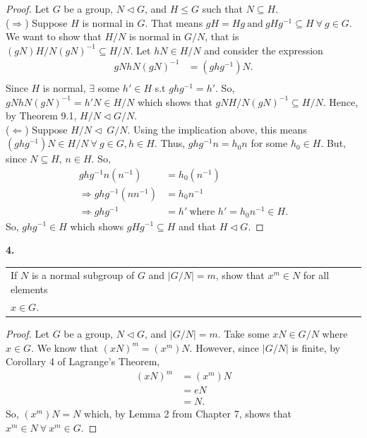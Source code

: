 \documentclass[12pt, letterpaper]{article}
\begin{document}
\begin{proof}
    Let $G$ be a group, $N \lhd G$, and $H \leq G$ such that $N \subseteq H$. \\
    ($\Rightarrow$) Suppose $H$ is normal in $G$. That means $gH = Hg \ \text{and} \ gHg^{-1} \subseteq H\ \forall \ g \in G$. We want to show that $H/N$ is normal in $G/N$, that is $(gN)H/N(gN)^{-1} \subseteq H/N$. Let $hN \in H/N$ and consider the expression 
    \begin{align*}
        gNhN(gN)^{-1} &= (ghg^{-1})N. \\
    \end{align*}
    Since $H$ is normal, $\exists$ some $h' \in H$ s.t $ghg^{-1} =h'$.
    So, $gNhN(gN)^{-1} = h'N\in H/N$ which shows that $gNH/N(gN)^{-1} \subseteq H/N$. Hence, by Theorem 9.1, $H/N \lhd G/N$. \\
    ($\Leftarrow$) Suppose $H/N \lhd \ G/N$. Using the implication above, this means $(ghg^{-1})N \in H/N \ \forall \ g \in G, h\in H$. Thus, $ghg^{-1}n = h_0n$ for some $h_0 \in H$. But, since $N \subseteq H$, $n \in H$. So, 
    \begin{align*}
        ghg^{-1}n(n^{-1}) &= h_0(n^{-1}) \\
    \Rightarrow ghg^{-1}(nn^{-1}) &= h_0n^{-1} \\
    \Rightarrow ghg^{-1} &= h' \ \text{where $h' = h_0n^{-1} \in H$}.
    \end{align*}
    So, $ghg^{-1} \in H$ which shows $gHg^{-1} \subseteq H$ and that $H \lhd G$.
\end{proof} \vspace{0.2em}
\noindent \textbf{4.} \  \begin{tabular}[t]{l}
     If $N$ is a normal subgroup of $G$ and $|G/N| = m$, show that $x^{m} \in N$ for all elements \\
     $x \in G$.
\end{tabular}
\begin{proof}
    Let $G$ be a group, $N \lhd G$, and $|G/N| = m$. Take some $xN \in G/N$ where $x\in G$. We know that $(xN)^{m} = (x^m)N.$ However, since $|G/N|$ is finite, by Corollary 4 of Lagrange's Theorem,
    \begin{align*}
        (xN)^{m} &= (x^m)N \\
        &= eN \\
        &= N.
    \end{align*}
    So, $(x^m)N = N$ which, by Lemma 2 from Chapter 7, shows that $x^m \in N \ \forall \ x^m \in G$.
\end{proof} \vspace{0.2em}
\end{document}

